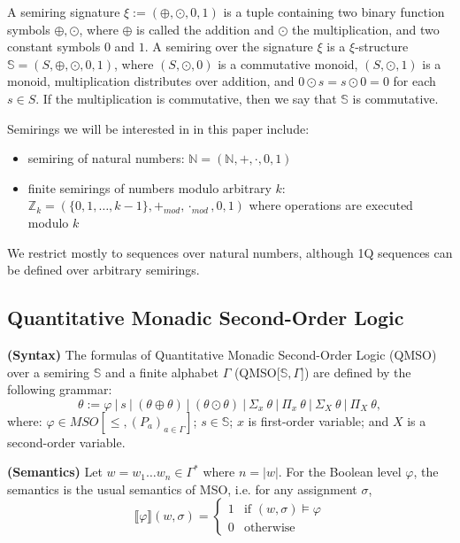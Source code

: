 \documentclass[12pt]{article}
\theoremstyle{definition}
\begin{document}
A semiring signature $\xi := (\oplus, \odot, 0, 1)$ is a tuple containing two binary function symbols $\oplus, \odot$, where $\oplus$ is called the addition and $\odot$ the multiplication, and two constant symbols $0$ and $1$. A semiring over the signature $\xi$ is a $\xi$-structure $\mathbb{S} = (S, \oplus, \odot, 0, 1)$, where $(S, \odot, 0)$ is a commutative monoid, $(S, \odot, 1)$ is a monoid, multiplication distributes over addition, and $0 \odot s = s \odot 0 = 0$ for each $s \in S$. If the multiplication is commutative, then we say that $\mathbb{S}$ is commutative.

Semirings we will be interested in in this paper include:

\begin{itemize}
    \item semiring of natural numbers: $\mathbb{N} = (\mathbb{N}, +, \cdot, 0, 1)$
    \item finite semirings of numbers modulo arbitrary $k$: $ \mathbb{Z}_k = (\{0,1,\ldots,k-1\}, +_{mod}, \cdot_{mod}, 0, 1)$ where operations are executed modulo $k$
\end{itemize}

We restrict mostly to sequences over natural numbers, although 1Q sequences can be defined over arbitrary semirings.

\subsection{Quantitative Monadic Second-Order Logic}

\textbf{(Syntax)} The formulas of Quantitative Monadic Second-Order Logic (QMSO) over a semiring $\mathbb{S}$ and a finite alphabet $\Gamma$ (QMSO[$\mathbb{S}, \Gamma$]) are defined by the following grammar:
$$ \theta := \varphi \ | \ s \ | \ (\theta \oplus \theta) \ | \ (\theta \odot \theta) \ | \ \Sigma_x \ \theta \ | \ \Pi_x \ \theta \ | \ \Sigma_X \ \theta \ | \ \Pi_X \ \theta,$$
where: $\varphi \in MSO[\leq, (P_a)_{a \in \Gamma}]$; $s \in \mathbb{S}$; $x$ is first-order variable; and $X$ is a second-order variable.

\textbf{(Semantics)} Let $w 
= w_1 \dots w_n \in \Gamma^*$ where $n = |w|$. For the Boolean level $\varphi$, the semantics is the usual semantics of MSO, i.e. for any assignment $\sigma$,
\begin{equation*}
    \llbracket\varphi\rrbracket(w, \sigma) =
      \begin{cases}
        1 & \text{if $(w, \sigma) \models \varphi$}\\
        0 & \text{otherwise}
      \end{cases}       
\end{equation*}
\end{document}
